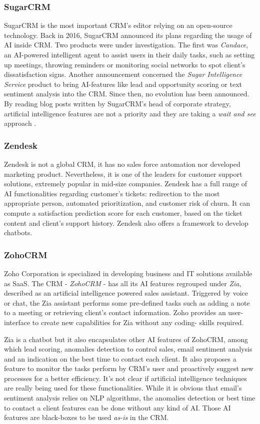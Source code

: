 \subsubsection*{SugarCRM}
SugarCRM is the most important CRM's editor relying on an open-source technology. Back in 2016, SugarCRM announced its plans regarding the usage of AI inside CRM. Two products were under investigation. The first was \textit{Candace}, an AI-powered intelligent agent to assist users in their daily tasks, such as setting up meetings, throwing reminders or monitoring social networks to spot client's dissatisfaction signs. Another announcement concerned the \textit{Sugar Intelligence Service} product to bring AI-features like lead and opportunity scoring or text sentiment analysis into the CRM. Since then, no evolution has been announced. By reading blog posts written by SugarCRM's head of corporate strategy, artificial intelligence features are not a priority and they are taking a \textit{wait and see} approach \cite{sugarcrm1,sugarcrm2}.

\subsubsection*{Zendesk}
Zendesk is not a global CRM, it has no sales force automation nor developed marketing product. Nevertheless, it is one of the leaders for customer support solutions, extremely popular in mid-size companies. Zendesk has a full range of AI functionalities regarding customer's tickets: redirection to the most appropriate person, automated prioritization, and customer risk of churn. It can compute a satisfaction prediction score for each customer, based on the ticket content and client's support history. Zendesk also offers a framework to develop chatbots.

\subsubsection*{ZohoCRM}
Zoho Corporation is specialized in developing business and IT solutions available as SaaS. The CRM - \textit{ZohoCRM} - has all its AI features regrouped under \textit{Zia}, described as an artificial intelligence powered sales assistant. Triggered by voice or chat, the Zia assistant performs some pre-defined tasks such as adding a note to a meeting or retrieving client's contact information. Zoho provides an user-interface to create new capabilities for Zia without any coding- skills required.

Zia is a chatbot but it also encapsulates other AI features of ZohoCRM, among which lead scoring, anomalies detection to control sales, email sentiment analysis and an indication on the best time to contact each client. It also proposes a feature to monitor the tasks perform by CRM's user and proactively suggest new processes for a better efficiency. It's not clear if artificial intelligence techniques are really being used for these functionalities. While it is obvious that email's sentiment analysis relies on NLP algorithms, the anomalies detection or best time to contact a client features can be done without any kind of AI. Those AI features are black-boxes to be used \textit{as-is} in the CRM.

